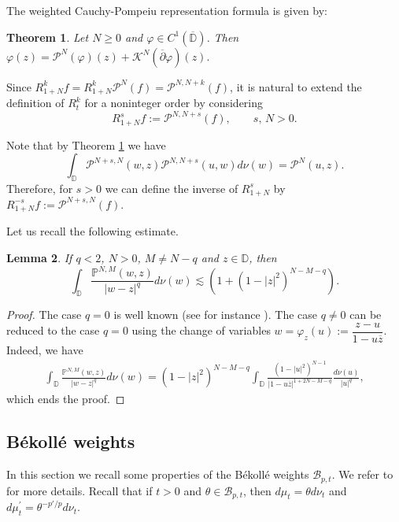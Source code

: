 \documentclass[12pt,twoside,leqno,final]{amsart}
\theoremstyle{plain}
\newtheorem{thm}{Theorem}[section]
\newtheorem{lem}[thm]{Lemma}
\begin{document}
The weighted Cauchy-Pompeiu representation formula  is given by:

\begin{thm}\label{thm:CP}
Let $N\ge 0$ and $\varphi\in C^1(\overline{{\mathbb D}})$. Then 
$
\varphi(z)={{\mathcal P}}^N(\varphi)(z)+{{\mathcal K}}^N(\overline{\partial} \varphi)(z).
$
\end{thm}

Since 
$R^k_{1+N} f=R^k_{1+N}{{\mathcal P}}^{N}(f)={{\mathcal P}}^{N,N+k}(f)$,
it is natural to extend the definition of $R^k_t$ for a noninteger order by considering  
\begin{equation}\label{eqn:Rts}
R^s_{1+N} f:={{\mathcal P}}^{N,N+s}(f),\qquad s, \, N>0.
\end{equation}

Note that by Theorem \ref{thm:CP} we have
$$
\int_{{\mathbb D}} {{\mathcal P}}^{N+s,N}(w,z){{\mathcal P}}^{N,N+s}(u,w)d\nu(w)={{\mathcal P}}^{N}(u,z).
$$
Therefore, for $s>0$ we can define the inverse of $R^{s}_{1+N}$ by  
$
R^{-s}_{1+N} f:={{\mathcal P}}^{N+s,N}(f).
$

Let us recall the following estimate.

\begin{lem} \label{lem:estP}
If $q<2$, $N>0$, $M\ne N-q$ and $z\in{{\mathbb D}}$, then
$$
\int_{{\mathbb D}}\frac{{\mathbb{P}}^{N,M}(w,z)}{|w-z|^q}d\nu(w)\lesssim (1+(1-|z|^2)^{N-M-q}).
$$
\end{lem}

\begin{proof} The case $q=0$ is well known (see for  instance \cite[Lemma 4.2.2 ]{Zhu1}). 
The case $q\ne 0$ can be reduced to the case $q=0$
using the change of variables $w=\varphi_z(u):=\dfrac{z-u}{1-u\overline z}$. Indeed,
we have
\begin{align*}
\int_{{\mathbb D}}\frac{{\mathbb{P}}^{N,M}(w,z)}{|w-z|^q}d\nu(w)
=(1-|z|^2)^{N-M-q}\int_{{\mathbb D}} \frac{(1-|u|^2)^{N-1}}{|1-u\overline z|^{1+2N-M-q}}\frac{d\nu(u)}{|u|^q},
\end{align*}
which ends the proof.
\end{proof}

\subsection{B\'ekoll\'e weights} \label{sec:Bekolle}\quad\par

In this section we recall some properties of the B\'ekoll\'e weights ${{\mathcal B}}_{p,t}$. We refer to \cite{Be} for  more details. 
Recall that  if $t>0$ and $\theta\in {{\mathcal B}}_{p,t}$, then $d\mu_t=\theta d\nu_t$ and $d\mu^\prime_t=\theta^{-p'/p}d\nu_t$.
\end{document}

